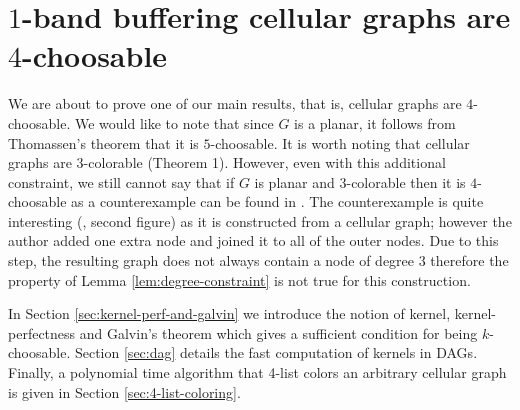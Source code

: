 \documentclass[a4paper, 12pt]{article}
\begin{document}
\section{$1$-band buffering cellular graphs are $4$-choosable}\label{sec:4-choosable}
We are about to prove one of our main results, that is, cellular graphs are $4$-choosable. We would like to note that since $G$ is a planar, it follows from Thomassen's theorem \cite{Thomassen:1994:PG:184180.184192} that it is $5$-choosable. It is worth noting that cellular graphs are $3$-colorable \cite{662943} (Theorem 1). However, even with this additional constraint, we still cannot say that if $G$ is planar and $3$-colorable then it is $4$-choosable as a counterexample can be found in \cite{JGT:JGT4}. The counterexample is quite interesting (\cite {JGT:JGT4}, second figure) as it is constructed from a cellular graph; however the author added one extra node and joined it to all of the outer nodes. Due to this step, the resulting graph does not always contain a node of degree $3$ therefore the property of Lemma \ref{lem:degree-constraint} is not true for this construction.

In Section \ref{sec:kernel-perf-and-galvin} we introduce the notion of kernel, kernel-perfectness and Galvin's theorem which gives a sufficient condition for being $k$-choosable. Section \ref{sec:dag} details the fast computation of kernels in DAGs. Finally, a polynomial time algorithm that 4-list colors an arbitrary cellular graph is given in Section \ref{sec:4-list-coloring}.
\end{document}
